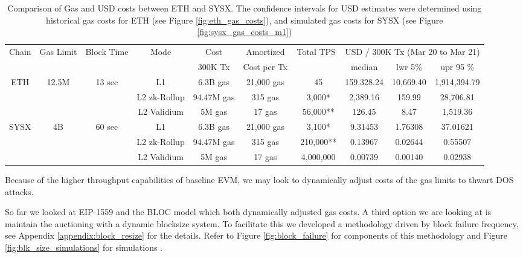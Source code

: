 \documentclass[peerreview]{ieeesyscoin}
\begin{document}
\begin{table}[h!]
\centering
\begin{tabular}{ |c|c|c|c|c|c|c|c|c|c|   } 
\hline
Chain & Gas  Limit & Block Time & Mode & Cost  & Amortized  & Total TPS & \multicolumn{3}{|c|}{USD / 300K Tx (Mar 20 to Mar 21) } \\
 &  &  &  &  300K Tx  & Cost per Tx  &  & median & lwr 5\% &  upr 95 \% \\ 
\hline
\multirow{3}{*}{ETH} & \multirow{3}{*}{12.5M} & \multirow{3}{*}{13 sec} & L1 & 6.3B gas  & 21,000 gas  & ~45 & 159,328.24 & 10,669.40  & 1,914,394.79  \\ 
\multirow{3}{*}{} & \multirow{3}{*}{} & \multirow{3}{*}{} & L2 zk-Rollup & 94.47M gas  & 315 gas & ~3,000* & 2,389.16 & 159.99  & 28,706.81 \\ 
\multirow{3}{*}{} & \multirow{3}{*}{} & \multirow{3}{*}{} & L2 Validium  & 5M gas  & 17 gas & ~56,000** & 126.45 & 8.47  & 1,519.36 \\ 
\hline

\multirow{3}{*}{SYSX} & \multirow{3}{*}{4B} & \multirow{3}{*}{60 sec} & L1 & 6.3B gas  & 21,000 gas  & ~3,100*& 9.31453 & 1.76308 & 37.01621 \\ 
\multirow{3}{*}{} & \multirow{3}{*}{} & \multirow{3}{*}{} & L2 zk-Rollup & 94.47M gas  & 315 gas & ~210,000** & 0.13967 & 0.02644  & 0.55507 \\ 
\multirow{3}{*}{} & \multirow{3}{*}{} & \multirow{3}{*}{} & L2 Validium  & 5M gas  & 17 gas & ~4,000,000 & 0.00739 & 0.00140  & 0.02938 \\ 
\hline

\end{tabular}
\caption{Comparison of Gas and USD costs between ETH and SYSX. The confidence intervals for USD estimates were determined using historical gas costs for ETH (see Figure \ref{fig:eth_gas_costs}), and simulated gas costs for SYSX (see Figure \ref{fig:sysx_gas_costs_m1})}
\label{table:gas_cost_estimates}
\end{table}

Because of the higher throughput capabilities of baseline EVM, we may look to dynamically adjust costs of the gas limits \cite{Che17} to thwart DOS attacks.

So far we looked at EIP-1559 and the BLOC model which both dynamically adjusted gas costs. A third option we are looking at is maintain the auctioning with a dynamic blocksize system. To facilitate this we developed a methodology driven by block failure frequency, see Appendix \ref{appendix:block_resize} for the details. Refer to Figure \ref{fig:block_failure} for components of this methodology and Figure \ref{fig:blk_size_simulations} for simulations .
\end{document}
